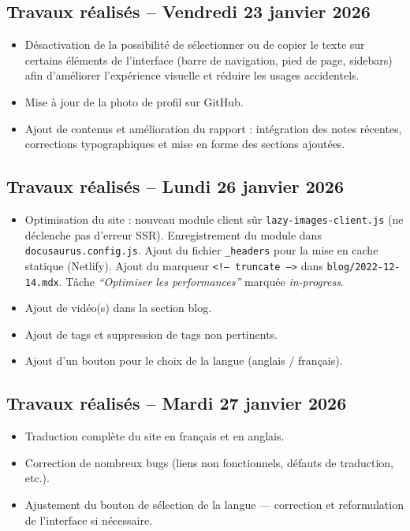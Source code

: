 \documentclass[12pt,a4paper]{report}
\begin{document}
\subsection*{Travaux réalisés -- Vendredi 23 janvier 2026}
\begin{itemize}
  \item Désactivation de la possibilité de sélectionner ou de copier le texte sur certains éléments de l'interface (barre de navigation, pied de page, sidebars) afin d'améliorer l'expérience visuelle et réduire les usages accidentels.
  \item Mise à jour de la photo de profil sur GitHub.
  \item Ajout de contenus et amélioration du rapport : intégration des notes récentes, corrections typographiques et mise en forme des sections ajoutées.
\end{itemize}

\subsection*{Travaux réalisés -- Lundi 26 janvier 2026}
\begin{itemize}
  \item Optimisation du site : nouveau module client sûr \texttt{lazy-images-client.js} (ne déclenche pas d'erreur SSR). Enregistrement du module dans \texttt{docusaurus.config.js}. Ajout du fichier \texttt{\_headers} pour la mise en cache statique (Netlify). Ajout du marqueur \texttt{\textless{}!-- truncate --\textgreater{}} dans \texttt{blog/2022-12-14.mdx}. Tâche \textit{``Optimiser les performances''} marquée \textit{in-progress}.
  \item Ajout de vidéo(s) dans la section blog.
  \item Ajout de tags et suppression de tags non pertinents.
  \item Ajout d'un bouton pour le choix de la langue (anglais / français).
\end{itemize}

\subsection*{Travaux réalisés -- Mardi 27 janvier 2026}
\begin{itemize}
  \item Traduction complète du site en français et en anglais.
  \item Correction de nombreux bugs (liens non fonctionnels, défauts de traduction, etc.).
  \item Ajustement du bouton de sélection de la langue — correction et reformulation de l'interface si nécessaire.
\end{itemize}
\end{document}
